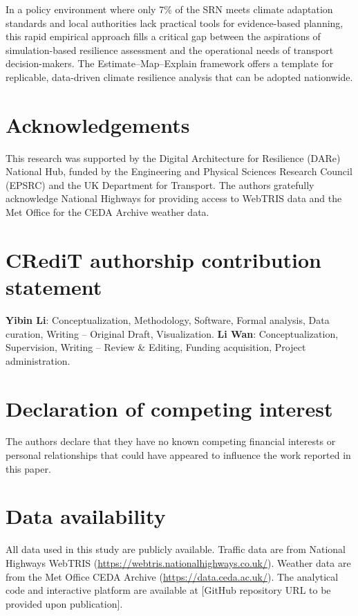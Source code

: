 \documentclass[review]{elsarticle}
\begin{document}
In a policy environment where only 7\% of the SRN meets climate adaptation standards and local authorities lack practical tools for evidence-based planning, this rapid empirical approach fills a critical gap between the aspirations of simulation-based resilience assessment and the operational needs of transport decision-makers. The Estimate--Map--Explain framework offers a template for replicable, data-driven climate resilience analysis that can be adopted nationwide.


\section*{Acknowledgements}

This research was supported by the Digital Architecture for Resilience (DARe) National Hub, funded by the Engineering and Physical Sciences Research Council (EPSRC) and the UK Department for Transport. The authors gratefully acknowledge National Highways for providing access to WebTRIS data and the Met Office for the CEDA Archive weather data.

\section*{CRediT authorship contribution statement}

\textbf{Yibin Li}: Conceptualization, Methodology, Software, Formal analysis, Data curation, Writing -- Original Draft, Visualization. \textbf{Li Wan}: Conceptualization, Supervision, Writing -- Review \& Editing, Funding acquisition, Project administration.

\section*{Declaration of competing interest}

The authors declare that they have no known competing financial interests or personal relationships that could have appeared to influence the work reported in this paper.

\section*{Data availability}

All data used in this study are publicly available. Traffic data are from National Highways WebTRIS (\url{https://webtris.nationalhighways.co.uk/}). Weather data are from the Met Office CEDA Archive (\url{https://data.ceda.ac.uk/}). The analytical code and interactive platform are available at [GitHub repository URL to be provided upon publication].
\end{document}
